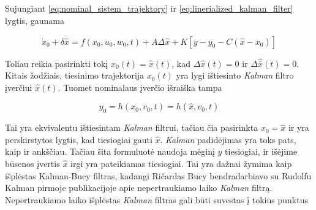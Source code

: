         Sujungiant \ref{eq:nominal_sistem_trajektory} ir \ref{eq:linerialized_kalman_filter} lygtis, gaunama

        \begin{equation}
            \dot{x}_0 + \delta \dot{\hat{x}} = f(x_0, u_0, w_0, t) + A \Delta \hat{x} + K[y-y_0 -C(\hat{x} - x_0)]
        \end{equation}

        Toliau reikia pasirinkti tokį $x_0(t)=\hat{x}(t)$, kad $\Delta\hat{x}(t) = 0$ ir $\Delta\hat{\bar{x}}(t) = 0$.
        Kitais žodžiais, tiesinimo trajektorija $x_0(t)$ yra lygi ištiesinto \textit{Kalman} filtro įverčiui $\hat{x}(t)$.
        Tuomet nominalaus įverčio išraiška tampa

        \begin{equation}
            y_0 = h(x_0, v_0, t) = h(\hat{x}, v_0, t)
        \end{equation}

        Tai yra ekvivalentu ištiesintam \textit{Kalman} filtrui, tačiau čia pasirinkta $x_0 = \hat{x}$ ir yra perskirstytos lygtis, kad tiesiogiai gauti $\hat{x}$.
        \textit{Kalman} padidėjimas yra toks pats, kaip ir ankščiau.
        Tačiau šita formuluotė naudoja mėginį $y$ tiesiogiai, ir išėjime būsenos įvertis $\hat{x}$ irgi yra pateikiamas tiesiogiai.
        Tai yra dažnai žymima kaip išplėstas Kalman-Bucy filtras, kadangi Ričardas Bucy bendradarbiavo su Rudolfu Kalman pirmoje publikacijoje apie nepertraukiamo laiko \textit{Kalman} filtrą.
        Nepertraukiamo laiko išplėstas \textit{Kalman} filtras gali būti suvestas į tokius punktus

